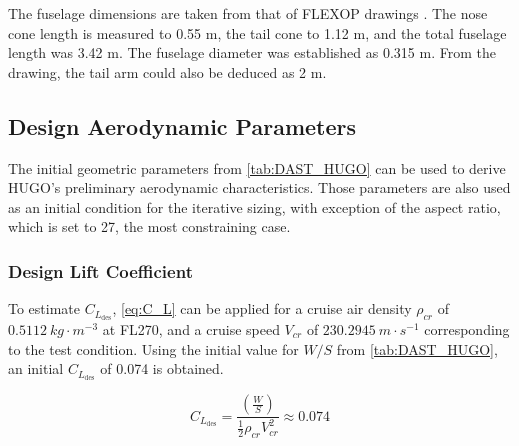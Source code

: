 The fuselage dimensions are taken from that of FLEXOP drawings \cite{flexop_lg}. The nose cone length is measured to  0.55 m, the tail cone to 1.12 m, and the total fuselage length was 3.42 m. The fuselage diameter was established as 0.315 m. From the drawing, the tail arm could also be deduced as 2 m.





\subsection{Design Aerodynamic Parameters}
\label{subsec:cl_des}
The initial geometric parameters from \autoref{tab:DAST_HUGO} can be used to derive HUGO's preliminary aerodynamic characteristics. Those parameters are also used as an initial condition for the iterative sizing, with exception of the aspect ratio, which is set to 27, the most constraining case.

\subsubsection*{Design Lift Coefficient}
To estimate $C_{L_\text{des}}$, \autoref{eq:C_L} \cite{Torenbeek1982} can be applied for a cruise air density $\rho_{cr}$ of $0.5112 \ kg \cdot m^{-3}$ at FL270, and a cruise speed $V_{cr}$ of $230.2945 \ m \cdot s^{-1}$ corresponding to the test condition. Using the initial value for $W/S$ from \autoref{tab:DAST_HUGO}, an initial $C_{L_\text{des}}$ of 0.074 is obtained.

\begin{equation}
    C_{L_\text{des}} = \frac{\left(\frac{W}{S}\right)}{\frac{1}{2} \rho_{cr} V_{cr}^2} \approx 0.074
    \label{eq:C_L}
\end{equation}

